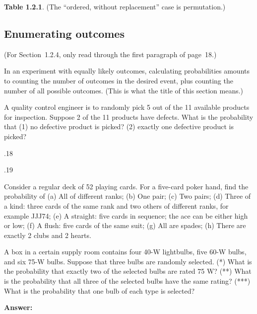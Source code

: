 \documentclass[12pt]{article}
\begin{document}
\textbf{Table 1.2.1}.
(The ``ordered, without replacement'' case is permutation.)


\subsection{Enumerating outcomes}

(For Section~1.2.4, only read through the first paragraph of page~18.)

In an experiment with equally likely outcomes,
calculating probabilities amounts to counting
the number of outcomes in the desired event,
plus counting the number of all possible outcomes.
(This is what the title of this section means.)

\example
A quality control engineer is to randomly pick 5 out of the 11 available
products for inspection. Suppose 2 of the 11 products have defects.
What is the probability that (1) no defective product is picked?
(2) exactly one defective product is picked?

.18

.19

\example
Consider a regular deck of 52 playing cards.
For a five-card poker hand, find the probability of
(a) All of different ranks;
(b) One pair;
(c) Two pairs;
(d) Three of a kind: three cards of the same rank and two others of
different ranks, for example JJJ74;
(e) A straight: five cards in sequence; the ace can be either high or
low;
(f) A flush: five cards of the same suit;
(g) All are spades;
(h) There are exactly 2 clubs and 2 hearts.


\example
A box in a certain supply room contains four 40-W lightbulbs, five 60-W
bulbs, and six 75-W bulbs.
Suppose that three bulbs are randomly selected.
(*) What is the probability that exactly two of the selected bulbs are
rated 75 W?
(**) What is the probability that all three of the selected bulbs have
the same rating?
(***) What is the probability that one bulb of each type is selected?

\textbf{Answer:}
\end{document}

